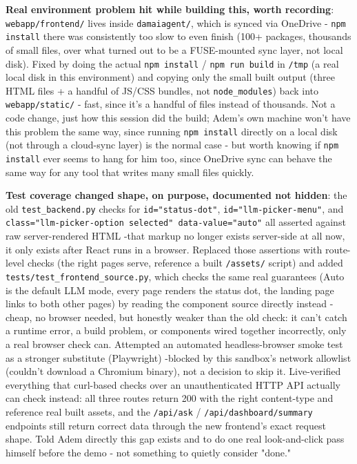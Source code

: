 \textbf{Real environment problem hit while building this, worth recording}: \texttt{webapp/\allowbreak{}frontend/\allowbreak{}} lives inside \texttt{damaiagent/\allowbreak{}}, which is synced via OneDrive - \texttt{npm install} there was consistently too slow to even finish (100+ packages, thousands of small files, over what turned out to be a FUSE-mounted sync layer, not local disk). Fixed by doing the actual \texttt{npm install} / \texttt{npm run build} in \texttt{/\allowbreak{}tmp} (a real local disk in this environment) and copying only the small built output (three HTML files + a handful of JS/CSS bundles, not \texttt{node\_\allowbreak{}modules}) back into \texttt{webapp/\allowbreak{}static/\allowbreak{}} - fast, since it's a handful of files instead of thousands. Not a code change, just how this session did the build; Adem's own machine won't have this problem the same way, since running \texttt{npm install} directly on a local disk (not through a cloud-sync layer) is the normal case - but worth knowing if \texttt{npm install} ever seems to hang for him too, since OneDrive sync can behave the same way for any tool that writes many small files quickly.

\textbf{Test coverage changed shape, on purpose, documented not hidden}: the old \texttt{test\_\allowbreak{}backend.py} checks for \texttt{id="status-dot"}, \texttt{id="llm-picker-menu"}, and \texttt{class="llm-picker-option selected" data-value="auto"} all asserted against raw server-rendered HTML -that markup no longer exists server-side at all now, it only exists after React runs in a browser. Replaced those assertions with route-level checks (the right pages serve, reference a built \texttt{/\allowbreak{}assets/\allowbreak{}} script) and added \texttt{tests/\allowbreak{}test\_\allowbreak{}frontend\_\allowbreak{}source.py}, which checks the same real guarantees (Auto is the default LLM mode, every page renders the status dot, the landing page links to both other pages) by reading the component source directly instead - cheap, no browser needed, but honestly weaker than the old check: it can't catch a runtime error, a build problem, or components wired together incorrectly, only a real browser check can. Attempted an automated headless-browser smoke test as a stronger substitute (Playwright) -blocked by this sandbox's network allowlist (couldn't download a Chromium binary), not a decision to skip it. Live-verified everything that curl-based checks over an unauthenticated HTTP API actually can check instead: all three routes return 200 with the right content-type and reference real built assets, and the \texttt{/\allowbreak{}api/\allowbreak{}ask} / \texttt{/\allowbreak{}api/\allowbreak{}dashboard/\allowbreak{}summary} endpoints still return correct data through the new frontend's exact request shape. Told Adem directly this gap exists and to do one real look-and-click pass himself before the demo - not something to quietly consider "done."


